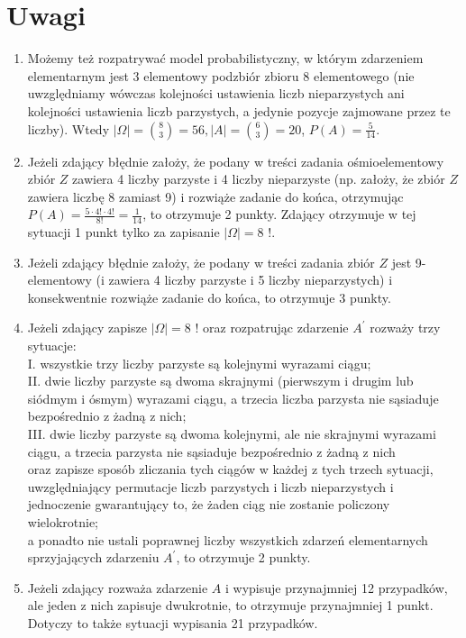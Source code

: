 \documentclass[10pt]{article}
\begin{document}
\section*{Uwagi}
\begin{enumerate}
  \item Możemy też rozpatrywać model probabilistyczny, w którym zdarzeniem elementarnym jest 3 elementowy podzbiór zbioru 8 elementowego (nie uwzględniamy wówczas kolejności ustawienia liczb nieparzystych ani kolejności ustawienia liczb parzystych, a jedynie pozycje zajmowane przez te liczby). Wtedy $|\Omega|=\binom{8}{3}=56,|A|=\binom{6}{3}=20$, $P(A)=\frac{5}{14}$.
  \item Jeżeli zdający błędnie założy, że podany w treści zadania ośmioelementowy zbiór $Z$ zawiera 4 liczby parzyste i 4 liczby nieparzyste (np. założy, że zbiór $Z$ zawiera liczbę 8 zamiast 9) i rozwiąże zadanie do końca, otrzymując $P(A)=\frac{5 \cdot 4!\cdot 4!}{8!}=\frac{1}{14}$, to otrzymuje 2 punkty. Zdający otrzymuje w tej sytuacji 1 punkt tylko za zapisanie $|\Omega|=8$ !.
  \item Jeżeli zdający błędnie założy, że podany w treści zadania zbiór $Z$ jest 9-elementowy (i zawiera 4 liczby parzyste i 5 liczby nieparzystych) i konsekwentnie rozwiąże zadanie do końca, to otrzymuje 3 punkty.
  \item Jeżeli zdający zapisze $|\Omega|=8$ ! oraz rozpatrując zdarzenie $A^{\prime}$ rozważy trzy sytuacje:\\
I. wszystkie trzy liczby parzyste są kolejnymi wyrazami ciągu;\\
II. dwie liczby parzyste są dwoma skrajnymi (pierwszym i drugim lub siódmym i ósmym) wyrazami ciągu, a trzecia liczba parzysta nie sąsiaduje bezpośrednio z żadną z nich;\\
III. dwie liczby parzyste są dwoma kolejnymi, ale nie skrajnymi wyrazami ciągu, a trzecia parzysta nie sąsiaduje bezpośrednio z żadną z nich\\
oraz zapisze sposób zliczania tych ciągów w każdej z tych trzech sytuacji, uwzględniający permutacje liczb parzystych i liczb nieparzystych i jednoczenie gwarantujący to, że żaden ciąg nie zostanie policzony wielokrotnie;\\
a ponadto nie ustali poprawnej liczby wszystkich zdarzeń elementarnych sprzyjających zdarzeniu $A^{\prime}$, to otrzymuje 2 punkty.
  \item Jeżeli zdający rozważa zdarzenie $A$ i wypisuje przynajmniej 12 przypadków, ale jeden z nich zapisuje dwukrotnie, to otrzymuje przynajmniej 1 punkt. Dotyczy to także sytuacji wypisania 21 przypadków.
\end{enumerate}
\end{document}
